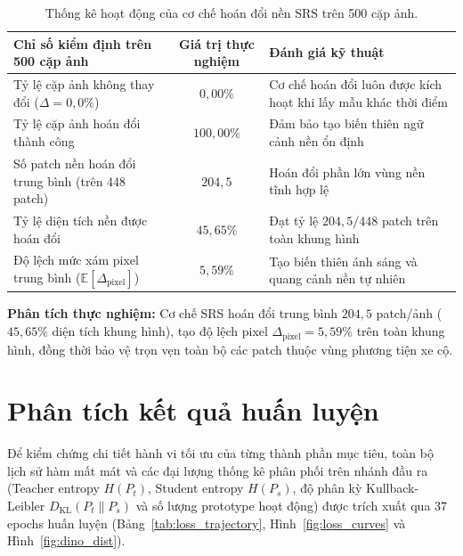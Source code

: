 \documentclass[11pt,a4paper]{article}
\begin{document}
\begin{table}[H]
\centering
\small
\renewcommand{\arraystretch}{0.92}
\caption{Thống kê hoạt động của cơ chế hoán đổi nền SRS trên 500 cặp ảnh.}
\label{tab:srs_metrics}
\begin{tabularx}{\textwidth}{>{\raggedright\arraybackslash}Xc>{\raggedright\arraybackslash}p{8cm}}
\toprule
\textbf{Chỉ số kiểm định trên 500 cặp ảnh} & \textbf{Giá trị thực nghiệm} & \textbf{Đánh giá kỹ thuật} \\
\midrule
Tỷ lệ cặp ảnh không thay đổi ($\Delta = 0{,}0\%$) & $0{,}00\%$ & Cơ chế hoán đổi luôn được kích hoạt khi lấy mẫu khác thời điểm \\
Tỷ lệ cặp ảnh hoán đổi thành công & $100{,}00\%$ & Đảm bảo tạo biến thiên ngữ cảnh nền ổn định \\
Số patch nền hoán đổi trung bình (trên 448 patch) & $204{,}5$ & Hoán đổi phần lớn vùng nền tĩnh hợp lệ \\
Tỷ lệ diện tích nền được hoán đổi & $45{,}65\%$ & Đạt tỷ lệ $204{,}5 / 448$ patch trên toàn khung hình \\
Độ lệch mức xám pixel trung bình ($\mathbb{E}[\Delta_{\text{pixel}}]$) & $5{,}59\%$ & Tạo biến thiên ánh sáng và quang cảnh nền tự nhiên \\
\bottomrule
\end{tabularx}
\end{table}

\noindent
\textbf{Phân tích thực nghiệm:} Cơ chế SRS hoán đổi trung bình $204{,}5$ patch/ảnh ($45{,}65\%$ diện tích khung hình), tạo độ lệch pixel $\Delta_{\text{pixel}} = 5{,}59\%$ trên toàn khung hình, đồng thời bảo vệ trọn vẹn toàn bộ các patch thuộc vùng phương tiện xe cộ.

\iffalse
\section{Phân tích kết quả huấn luyện}

Để kiểm chứng chi tiết hành vi tối ưu của từng thành phần mục tiêu, toàn bộ lịch sử hàm mất mát và các đại lượng thống kê phân phối trên nhánh đầu ra (Teacher entropy $H(P_t)$, Student entropy $H(P_s)$, độ phân kỳ Kullback-Leibler $D_{\text{KL}}(P_t \parallel P_s)$ và số lượng prototype hoạt động) được trích xuất qua $37$ epochs huấn luyện (Bảng~\ref{tab:loss_trajectory}, Hình~\ref{fig:loss_curves} và Hình~\ref{fig:dino_dist}).
\end{document}
